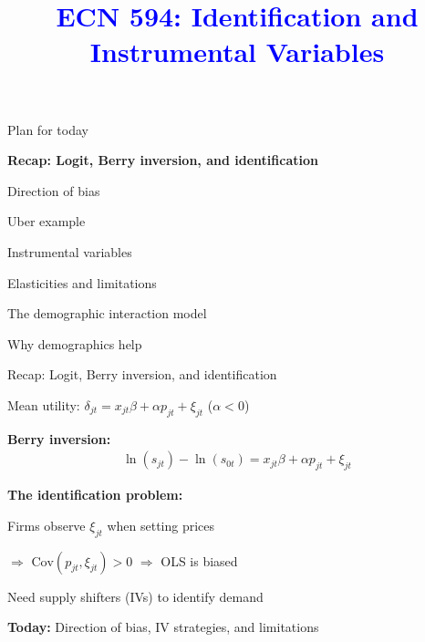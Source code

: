 \documentclass[notes,11pt, aspectratio=169]{beamer}
\title[]{\textcolor{blue}{ECN 594: Identification and Instrumental Variables}}
\author[PGP]{}
\institute[FRBNY]{\small{\begin{tabular}{c c c}
Nicholas Vreugdenhil \\
\end{tabular}}}
\date{}
\newenvironment{wideitemize}{\itemize\addtolength{\itemsep}{10pt}}{\enditemize}
\newenvironment{wideenumerate}{\enumerate\addtolength{\itemsep}{10pt}}{\endenumerate}
\begin{document}
\begin{frame}
\maketitle
  \centering
\end{frame}

\begin{frame}{Plan for today}
  \begin{wideenumerate}
    \item \textbf{Recap: Logit, Berry inversion, and identification}
    \item Direction of bias
    \item Uber example
    \item Instrumental variables
    \item Elasticities and limitations
    \item The demographic interaction model
    \item Why demographics help
  \end{wideenumerate}
\end{frame}


\begin{frame}{Recap: Logit, Berry inversion, and identification}
	\begin{wideitemize}
		\item Mean utility: $\delta_{jt} = x_{jt} \beta + \alpha p_{jt} + \xi_{jt}$ \quad ($\alpha < 0$)
		\item \textbf{Berry inversion:}
		\begin{align*}
			\ln(s_{jt}) - \ln(s_{0t}) = x_{jt} \beta + \alpha p_{jt} + \xi_{jt}
		\end{align*}
		\item \textbf{The identification problem:}
		\begin{wideitemize}
			\vspace{5pt}
			\item Firms observe $\xi_{jt}$ when setting prices
			\item $\Rightarrow$ $\text{Cov}(p_{jt}, \xi_{jt}) > 0$ $\Rightarrow$ OLS is biased
			\item Need supply shifters (IVs) to identify demand
		\end{wideitemize}
		\item \textbf{Today:} Direction of bias, IV strategies, and limitations
	\end{wideitemize}
\end{frame}
\end{document}
